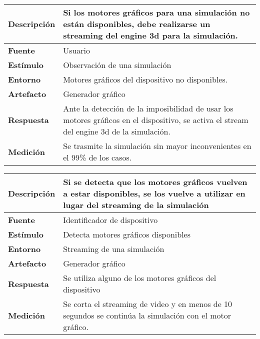 \begin{center}
  \begin{tabular}{| l | p{10cm} | }
    \hline
	\textbf{Descripción} & Si los motores gráficos para una simulación no están disponibles, debe realizarse un streaming del engine 3d para la simulación. \\  \hline
	\textbf{Fuente} & Usuario\\  \hline
	\textbf{Estímulo} & Observación de una simulación\\  \hline
	\textbf{Entorno} & Motores gráficos del dispositivo no disponibles.\\  \hline
	\textbf{Artefacto} & Generador gráfico\\  \hline
	\textbf{Respuesta} & Ante la detección de la imposibilidad de usar los motores gráficos en el dispositivo, se activa el stream del engine 3d de la simulación.\\  \hline
	\textbf{Medición} & Se trasmite la simulación sin mayor inconvenientes en el 99\% de los casos.\\  \hline
  \end{tabular}
\end{center}  

\begin{center}
  \begin{tabular}{| l | p{10cm} | }
    \hline
	\textbf{Descripción} & Si se detecta que los motores gráficos vuelven a estar disponibles, se los vuelve a utilizar en lugar del streaming de la simulación \\  \hline
	\textbf{Fuente} & Identificador de dispositivo\\  \hline
	\textbf{Estímulo} & Detecta motores gráficos disponibles\\  \hline
	\textbf{Entorno} & Streaming de una simulación\\  \hline
	\textbf{Artefacto} & Generador gráfico\\  \hline
	\textbf{Respuesta} & Se utiliza alguno de los motores gráficos del dispositivo\\  \hline
	\textbf{Medición} & Se corta el streaming de video y en menos de 10 segundos se continúa la simulación con el motor gráfico.\\  \hline
  \end{tabular}
\end{center}  

